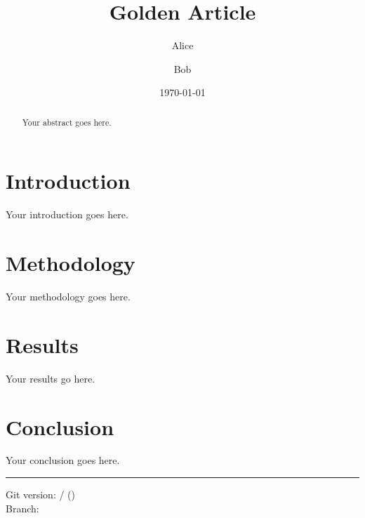 \documentclass[a4paper,11pt]{article}
\title{Golden Article}
\author{Alice \and Bob}
\date{\today}
\begin{document}
\maketitle

\begin{abstract}
    Your abstract goes here.
\end{abstract}

\section{Introduction}

Your introduction goes here.

\section{Methodology}

Your methodology goes here.

\section{Results}

Your results go here.

\section{Conclusion}

Your conclusion goes here.

\printbibliography

\vfill
\hrule
\small
\noindent Git version: \gitDescribe{} / \gitAbbrevHash{} (\gitAuthorIsoDate) \\
Branch: \gitBranch
\end{document}
